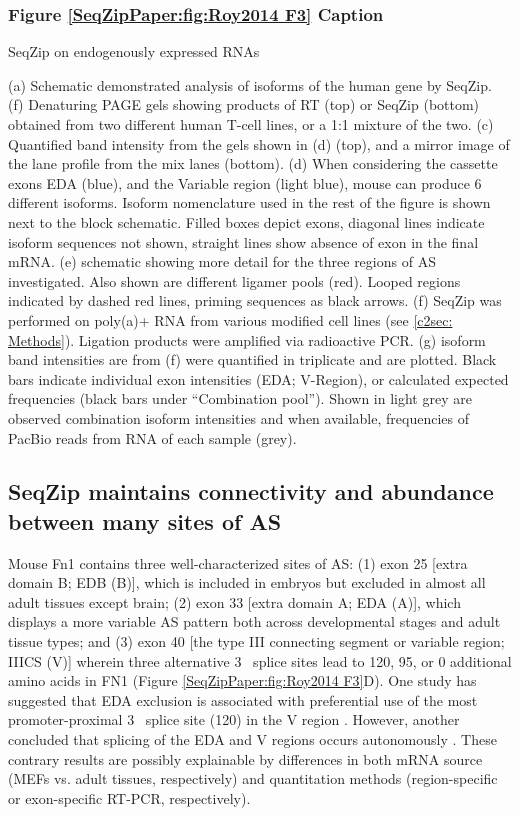 			\subsubsection{Figure \ref{SeqZipPaper:fig:Roy2014 F3} Caption} \label{SeqZipPaper:figCap: Roy2014 F3}

				SeqZip on endogenously expressed RNAs

				(a) Schematic demonstrated analysis of isoforms of the human \cd{} gene by SeqZip.
				(f) Denaturing PAGE gels showing products of RT (top) or SeqZip (bottom) \cd{} obtained from two different human T-cell lines, or a 1:1 mixture of the two.
				(c) Quantified band intensity from the gels shown in (d) (top), and a mirror image of the lane profile from the mix lanes (bottom).
				(d) When considering the cassette exons EDA (blue), and the Variable region (light blue), mouse \fn{} can produce 6 different isoforms. Isoform nomenclature used in the rest of the figure is shown next to the block schematic. Filled boxes depict exons, diagonal lines indicate isoform sequences not shown, straight lines show absence of exon in the final mRNA.
				(e) schematic showing more detail for the three regions of \fn{} AS investigated. Also shown are different ligamer pools (red). Looped regions indicated by dashed red lines, priming sequences as black arrows. 
				 (f) SeqZip was performed on poly(a)+ RNA from various \fn{} modified cell lines (see \ref{c2sec: Methods}). Ligation products were amplified via radioactive PCR. 
				(g) isoform band intensities are from (f) were quantified in triplicate and are plotted. Black bars indicate individual exon intensities (EDA; V-Region), or calculated expected frequencies (black bars under ``Combination pool''). Shown in light grey are observed combination isoform intensities and when available, frequencies of PacBio reads from RNA of each sample (grey). 

	\subsection{SeqZip maintains connectivity and abundance between many sites of AS}\label{SeqZipPaper:subsec: SeqZip Maintains Connectivity}

		Mouse Fn1 contains three well-characterized sites of AS: (1) exon 25 [extra domain B; EDB (B)], which is included in embryos but excluded in almost all adult tissues except brain; (2) exon 33 [extra domain A; EDA (A)], which displays a more variable AS pattern both across developmental stages and adult tissue types; and (3) exon 40 [the type III connecting segment or variable region; IIICS (V)] wherein three alternative 3\textprime~ splice sites lead to 120, 95, or 0 additional amino acids in FN1 (Figure \ref{SeqZipPaper:fig:Roy2014 F3}D). One study has suggested that EDA exclusion is associated with preferential use of the most promoter-proximal 3\textprime~ splice site (120) in the V region \citep{Fededa2005}. However, another concluded that splicing of the EDA and V regions occurs autonomously \citep{Chauhan2004}. These contrary results are possibly explainable by differences in both mRNA source (MEFs vs. adult tissues, respectively) and quantitation methods (region-specific or exon-specific RT-PCR, respectively).

